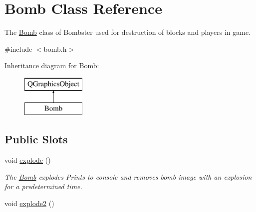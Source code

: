 \hypertarget{class_bomb}{\section{Bomb Class Reference}
\label{class_bomb}
}


The \hyperlink{class_bomb}{Bomb} class of Bombster used for destruction of blocks and players in game.  




{\ttfamily \#include $<$bomb.\-h$>$}

Inheritance diagram for Bomb\-:\begin{figure}[H]
\begin{center}
\leavevmode
\includegraphics[height=2.000000cm]{class_bomb}
\end{center}
\end{figure}
\subsection*{Public Slots}
\begin{DoxyCompactItemize}
\item 
void \hyperlink{class_bomb_a5752ce7daece5c3bf2e2178bcfcb820d}{explode} ()
\begin{DoxyCompactList}\small\item\em The \hyperlink{class_bomb}{Bomb} explodes Prints to console and removes bomb image with an explosion for a predetermined time. \end{DoxyCompactList}\item 
void \hyperlink{class_bomb_ae9410dc9b499dad8e4f0f200d9b0ead7}{explode2} ()
\end{DoxyCompactItemize}
